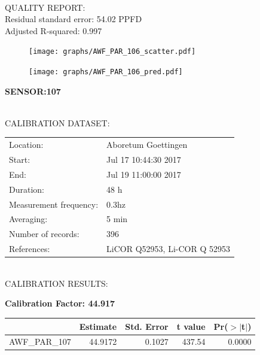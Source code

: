 \documentclass[oneside]{report}
\begin{document}
\hrulefill\\
QUALITY REPORT:\\
Residual standard error: 54.02 PPFD\\
Adjusted R-squared: 0.997



\begin{figure}[H]
  \centering
  \texttt{[image: graphs/AWF\_PAR\_106\_scatter.pdf]}
\end{figure}




\begin{figure}[H]
  \centering
  \texttt{[image: graphs/AWF\_PAR\_106\_pred.pdf]}
\end{figure}

\pagebreak


\begin{center}
\large{\textbf{SENSOR:107}}\\
\end{center}

\hrulefill\\
CALIBRATION DATASET:\\
\begin{table}[h!]
  \centering
  \label{tab:table1}
  \begin{tabular}{ll}
    Location: & Aboretum Goettingen\\ 
    
    
    Start:  & Jul 17 10:44:30 2017 \\
    End:   & Jul 19 11:00:00 2017\\ 
    Duration: & 48 h\\
    Measurement frequency: & 0.3hz\\
    Averaging:  &5 min\\
    Number of records: & 396 \\
    References: & LiCOR Q52953, Li-COR Q 52953 \\
  \end{tabular}
\end{table}

\hrulefill\\
CALIBRATION RESULTS:\\


\begin{center}
\textbf{\large{Calibration Factor: 44.917}}\\
\end{center}
\begin{table}[ht]
\centering
\begin{tabular}{rrrrr}
  \hline
 & Estimate & Std. Error & t value & Pr($>$$|$t$|$) \\ 
  \hline
AWF\_PAR\_107 & 44.9172 & 0.1027 & 437.54 & 0.0000 \\ 
   \hline
\end{tabular}
\end{table}
\end{document}

